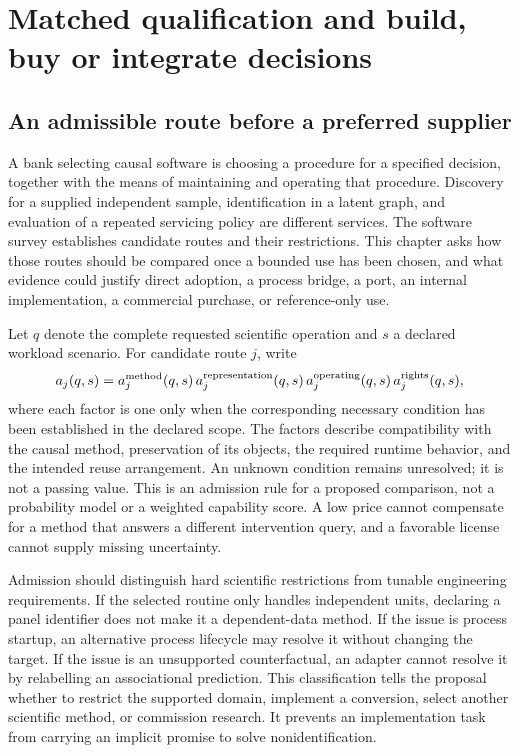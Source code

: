 \chapter{Matched qualification and build, buy or integrate decisions}
\label{exec16:s10}

\section{An admissible route before a preferred supplier}

A bank selecting causal software is choosing a procedure for a specified
decision, together with the means of maintaining and operating that procedure.
Discovery for a supplied independent sample, identification in a latent graph,
and evaluation of a repeated servicing policy are different services. The
software survey establishes candidate routes and their restrictions. This
chapter asks how those routes should be compared once a bounded use has been
chosen, and what evidence could justify direct adoption, a process bridge, a
port, an internal implementation, a commercial purchase, or reference-only use.

Let \(q\) denote the complete requested scientific operation and \(s\) a
declared workload scenario. For candidate route \(j\), write
\[
 a_j(q,s)=a_j^{\rm method}(q,s)\,a_j^{\rm representation}(q,s)
          \,a_j^{\rm operating}(q,s)\,a_j^{\rm rights}(q,s),
\]
where each factor is one only when the corresponding necessary condition has
been established in the declared scope. The factors describe compatibility
with the causal method, preservation of its objects, the required runtime
behavior, and the intended reuse arrangement. An unknown condition remains
unresolved; it is not a passing value. This is an admission rule for a proposed
comparison, not a probability model or a weighted capability score. A low
price cannot compensate for a method that answers a different intervention
query, and a favorable license cannot supply missing uncertainty.
\citep{exec16_s10_design}

Admission should distinguish hard scientific restrictions from tunable
engineering requirements. If the selected routine only handles independent
units, declaring a panel identifier does not make it a dependent-data method.
If the issue is process startup, an alternative process lifecycle may resolve
it without changing the target. If the issue is an unsupported counterfactual,
an adapter cannot resolve it by relabelling an associational prediction. This
classification tells the proposal whether to restrict the supported domain,
implement a conversion, select another scientific method, or commission
research. It prevents an implementation task from carrying an implicit promise
to solve nonidentification.

